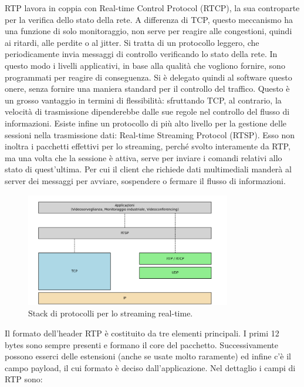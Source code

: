 RTP lavora in coppia con Real-time Control Protocol (RTCP), la sua controparte per la verifica dello stato della rete. A differenza di TCP, questo meccanismo ha una funzione di solo monitoraggio, non serve per reagire alle congestioni, quindi ai ritardi, alle perdite o al jitter. Si tratta di un protocollo leggero, che periodicamente invia messaggi di controllo verificando lo stato della rete. In questo modo i livelli applicativi, in base alla qualità che vogliono fornire, sono programmati per reagire di conseguenza. Si è delegato quindi al software questo onere, senza fornire una maniera standard per il controllo del traffico. Questo è un grosso vantaggio in termini di flessibilità: sfruttando TCP, al contrario, la velocità di trasmissione dipenderebbe dalle sue regole nel controllo del flusso di informazioni. Esiste infine un protocollo di più alto livello per la gestione delle sessioni nella trasmissione dati: Real-time Streaming Protocol (RTSP). Esso non inoltra i pacchetti effettivi per lo streaming, perché svolto interamente da RTP, ma una volta che la sessione è attiva, serve per inviare i comandi relativi allo stato di quest'ultima. Per cui il client che richiede dati multimediali manderà al server dei messaggi per avviare, sospendere o fermare il flusso di informazioni.


\begin{figure}[htbp]
    \centering
    \includegraphics[width=0.8\textwidth]{figures/streaming_stack.png}
    \caption{Stack di protocolli per lo streaming real-time.}
    \label{straming-stack}
\end{figure}

Il formato dell'header RTP è costituito da tre elementi principali. I primi 12 bytes sono sempre presenti e formano il core del pacchetto. Successivamente possono esserci delle estensioni (anche se usate molto raramente) ed infine c'è il campo payload, il cui formato è deciso dall'applicazione. Nel dettaglio i campi di RTP sono:

